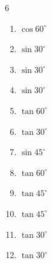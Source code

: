 \begin{multicols}{6}
\begin{enumerate}
        \phantom{$\displaystyle =1$}

  \item $\displaystyle \cos{60^\circ}$


  \item $\displaystyle \sin{30^\circ}$


  \item $\displaystyle \sin{30^\circ}$


  \item $\displaystyle \sin{30^\circ}$


  \item $\displaystyle \tan{60^\circ}$


  \item $\displaystyle \tan{30^\circ}$


  \item $\displaystyle \sin{45^\circ}$


  \item $\displaystyle \tan{60^\circ}$


  \item $\displaystyle \tan{45^\circ}$

        \phantom{$\displaystyle =1$}

  \item $\displaystyle \tan{45^\circ}$

        \phantom{$\displaystyle =1$}

  \item $\displaystyle \tan{30^\circ}$


  \item $\displaystyle \tan{30^\circ}$


\columnbreak %


\end{enumerate}
\end{multicols}

